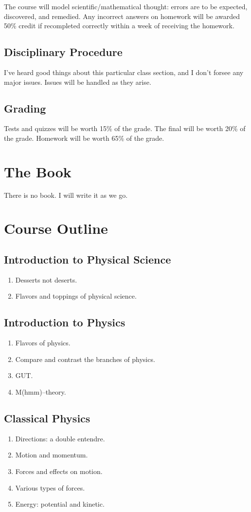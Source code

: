 \documentclass[11pt,article,oneside]{memoir}
\begin{document}
The course will model scientific/mathematical thought: errors are to be expected, discovered, and remedied. Any incorrect answers
on homework will be awarded 50\% credit if recompleted correctly within a week of receiving the homework.
\subsection*{Disciplinary Procedure}
	I've heard good things about this particular class section, and I don't forsee any major issues. Issues will be handled as they arise.
\subsection*{Grading}
	Tests and quizzes will be worth 15\% of the grade. The final will be worth 20\% of the grade. Homework will be worth 65\% of the grade.




\section*{The Book}
There is no book. I will write it as we go.



\section*{Course Outline}
\subsection*{Introduction to Physical Science}
\begin{enumerate}
\item Desserts not deserts.
\item Flavors and toppings of physical science.
\end{enumerate}
\subsection*{Introduction to Physics}
\begin{enumerate}
\item Flavors of physics.
\item Compare and contrast the branches of physics.
\item GUT.
\item M(hmm)--theory.
\end{enumerate}
\subsection*{Classical Physics}
\begin{enumerate}
\item Directions: a double entendre.
\item Motion and momentum.
\item Forces and effects on motion.
\item Various types of forces.
\item Energy: potential and kinetic.
\end{enumerate}
\end{document}
